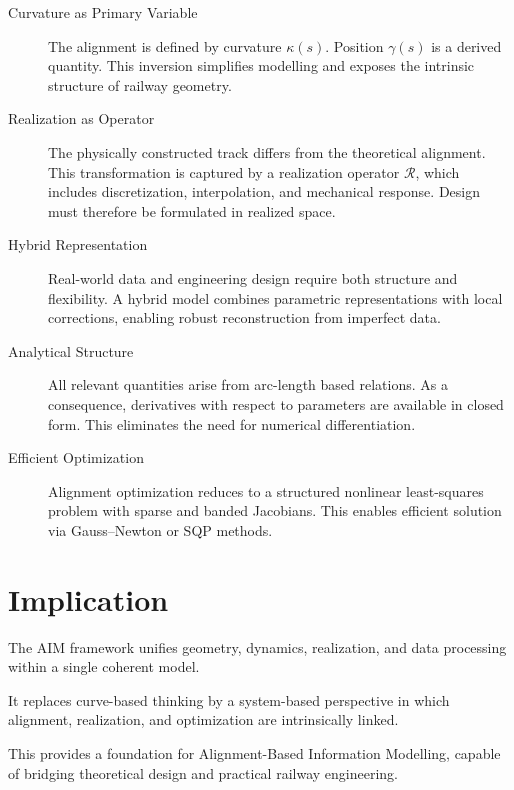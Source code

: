 \begin{description}

\item[Curvature as Primary Variable]
The alignment is defined by curvature \(\kappa(s)\).
Position \(\gamma(s)\) is a derived quantity.
This inversion simplifies modelling and exposes the intrinsic structure
of railway geometry.

\item[Realization as Operator]
The physically constructed track differs from the theoretical alignment.
This transformation is captured by a realization operator
\(\mathcal{R}\), which includes discretization, interpolation, and
mechanical response.
Design must therefore be formulated in realized space.

\item[Hybrid Representation]
Real-world data and engineering design require both structure and
flexibility.
A hybrid model combines parametric representations with local
corrections, enabling robust reconstruction from imperfect data.

\item[Analytical Structure]
All relevant quantities arise from arc-length based relations.
As a consequence, derivatives with respect to parameters are available
in closed form.
This eliminates the need for numerical differentiation.

\item[Efficient Optimization]
Alignment optimization reduces to a structured nonlinear least-squares
problem with sparse and banded Jacobians.
This enables efficient solution via Gauss--Newton or SQP methods.

\end{description}

\section*{Implication}

The AIM framework unifies geometry, dynamics, realization, and data
processing within a single coherent model.

It replaces curve-based thinking by a system-based perspective in which
alignment, realization, and optimization are intrinsically linked.

This provides a foundation for Alignment-Based Information Modelling,
capable of bridging theoretical design and practical railway
engineering.
